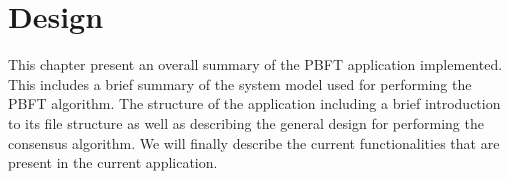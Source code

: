 \chapter{Design}
\label{chapter:Design}

This chapter present an overall summary of the PBFT application implemented. This includes a brief summary of the system model used for performing the PBFT algorithm. The structure of the application including a brief introduction to its file structure as well as describing the general design for performing the consensus algorithm. We will finally describe the current functionalities that are present in the current application. 
